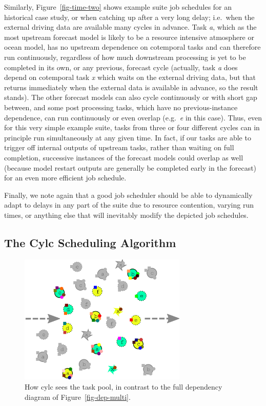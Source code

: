 \documentclass[11pt,a4paper]{article}
\begin{document}
Similarly, Figure~\ref{fig-time-two} shows example suite job schedules
for an historical case study, or when catching up after a very long
delay; i.e.\ when the external driving data are available many cycles in
advance.  Task {\em a}, which as the most upstream forecast model is
likely to be a resource intensive atmosphere or ocean model, has no
upstream dependence on cotemporal tasks and can therefore run
continuously, regardless of how much downstream processing is yet to be
completed in its own, or any previous, forecast cycle (actually, task
{\em a} does depend on cotemporal task {\em x} which waits on the
external driving data, but that returns immediately when the external
data is available in advance, so the result stands). The other forecast
models can also cycle continuously or with short gap between, and some
post processing tasks, which have no previous-instance dependence, can
run continuously or even overlap (e.g.\ {\em e} in this case). Thus,
even for this very simple example suite, tasks from three or four
different cycles can in principle run simultaneously at any given time. 
In fact, if our tasks are able to trigger off internal outputs of 
upstream tasks, rather than waiting on full completion, successive
instances of the forecast models could overlap as well (because model
restart outputs are generally be completed early in the forecast) for an
even more efficient job schedule. 

Finally, we note again that a good job scheduler should be able to
dynamically adapt to delays in any part of the suite due to resource
contention, varying run times, or anything else that will inevitably
modify the depicted job schedules. 

\subsection{The Cylc Scheduling Algorithm} 
\label{TheCylcSchedulingAlgorithm}

\begin{figure}
    \begin{center} 
        \includegraphics[width=8cm]{inkscape-svg/task-pool}
    \end{center} 
    \caption[The cylc task pool]{\small How cylc sees the task pool, in
    contrast to the full dependency diagram of Figure~\ref{fig-dep-multi}.} 
    \label{fig-task-pool}
\end{figure} 
\end{document}
